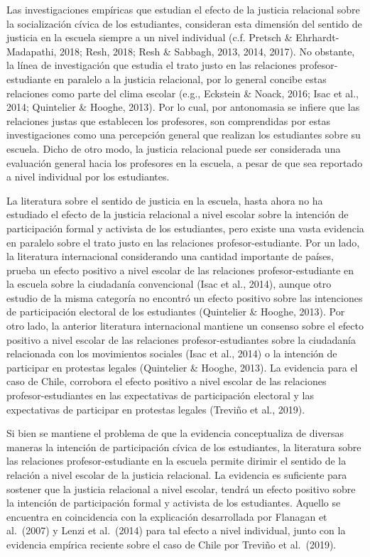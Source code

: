\documentclass[12pt,twoside]{templates/facsothesis}
\begin{document}
Las investigaciones empíricas que estudian el efecto de la justicia relacional sobre la socialización cívica de los estudiantes, consideran esta dimensión del sentido de justicia en la escuela siempre a un nivel individual (c.f. Pretsch \& Ehrhardt-Madapathi, 2018; Resh, 2018; Resh \& Sabbagh, 2013, 2014, 2017). No obstante, la línea de investigación que estudia el trato justo en las relaciones profesor-estudiante en paralelo a la justicia relacional, por lo general concibe estas relaciones como parte del clima escolar (e.g., Eckstein \& Noack, 2016; Isac et al., 2014; Quintelier \& Hooghe, 2013). Por lo cual, por antonomasia se infiere que las relaciones justas que establecen los profesores, son comprendidas por estas investigaciones como una percepción general que realizan los estudiantes sobre su escuela. Dicho de otro modo, la justicia relacional puede ser considerada una evaluación general hacia los profesores en la escuela, a pesar de que sea reportado a nivel individual por los estudiantes.

La literatura sobre el sentido de justicia en la escuela, hasta ahora no ha estudiado el efecto de la justicia relacional a nivel escolar sobre la intención de participación formal y activista de los estudiantes, pero existe una vasta evidencia en paralelo sobre el trato justo en las relaciones profesor-estudiante. Por un lado, la literatura internacional considerando una cantidad importante de países, prueba un efecto positivo a nivel escolar de las relaciones profesor-estudiante en la escuela sobre la ciudadanía convencional (Isac et al., 2014), aunque otro estudio de la misma categoría no encontró un efecto positivo sobre las intenciones de participación electoral de los estudiantes (Quintelier \& Hooghe, 2013). Por otro lado, la anterior literatura internacional mantiene un consenso sobre el efecto positivo a nivel escolar de las relaciones profesor-estudiantes sobre la ciudadanía relacionada con los movimientos sociales (Isac et al., 2014) o la intención de participar en protestas legales (Quintelier \& Hooghe, 2013). La evidencia para el caso de Chile, corrobora el efecto positivo a nivel escolar de las relaciones profesor-estudiantes en las expectativas de participación electoral y las expectativas de participar en protestas legales (Treviño et al., 2019).

Si bien se mantiene el problema de que la evidencia conceptualiza de diversas maneras la intención de participación cívica de los estudiantes, la literatura sobre las relaciones profesor-estudiante en la escuela permite dirimir el sentido de la relación a nivel escolar de la justicia relacional. La evidencia es suficiente para sostener que la justicia relacional a nivel escolar, tendrá un efecto positivo sobre la intención de participación formal y activista de los estudiantes. Aquello se encuentra en coincidencia con la explicación desarrollada por Flanagan et al.~(2007) y Lenzi et al.~(2014) para tal efecto a nivel individual, junto con la evidencia empírica reciente sobre el caso de Chile por Treviño et al.~(2019).
\end{document}
